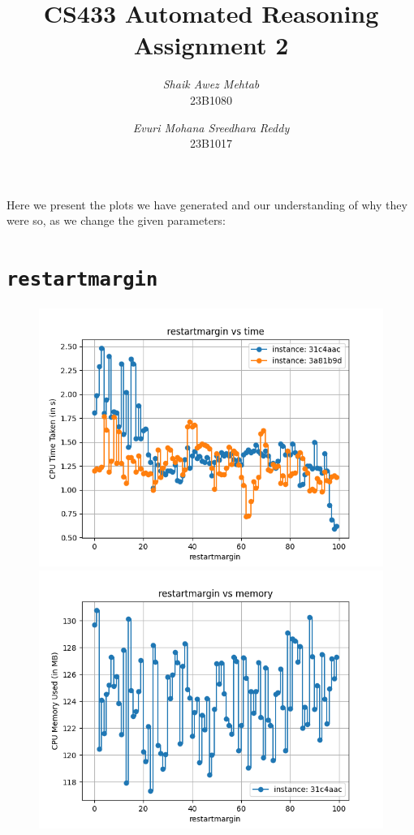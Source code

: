\documentclass{article}
\title{CS433 Automated Reasoning \\ Assignment 2}
\author{\textit{Shaik Awez Mehtab} \\ 23B1080
        \and
        \textit{Evuri Mohana Sreedhara Reddy} \\ 23B1017}
\date{}
\begin{document}
    \maketitle
    Here we present the plots we have generated and our understanding of why
    they were so, as we change the given parameters:
    \section*{\texttt{restartmargin}}
    \begin{figure}[H]
        \centering
        \begin{minipage}{0.45\textwidth}
            \centering
            \includegraphics[width = \linewidth]{restartmargin-0.png}
        \end{minipage}
        \hfill
        \begin{minipage}{0.45\textwidth}
            \centering
            \includegraphics[width = \linewidth]{restartmargin-1.png}
        \end{minipage}
    \end{figure}
\end{document}
